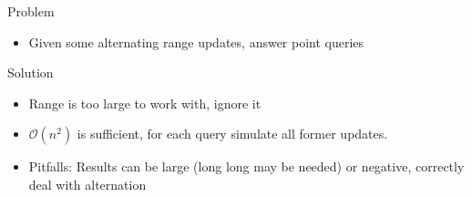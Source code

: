 \begin{frame}
    \frametitle{\problemtitle}
    \begin{block}{Problem}
    \begin{itemize}
        \item Given some alternating range updates, answer point queries
    \end{itemize}
    \end{block}
    \pause
    \begin{block}{Solution}
    \begin{itemize}
        \item<+-> Range is too large to work with, ignore it
        \item<+-> $\mathcal O(n^2)$ is sufficient, for each query simulate all former updates.
        \item<+-> Pitfalls: Results can be large (long long may be needed) or negative, correctly deal with alternation
    \end{itemize}
    \end{block}
\end{frame}
